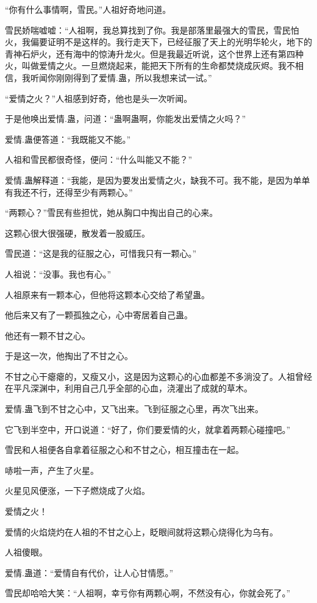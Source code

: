 \begin{this_body}
“你有什么事情啊，雪民。”人祖好奇地问道。

雪民娇喘嘘嘘：“人祖啊，我总算找到了你。我是部落里最强大的雪民，雪民怕火，我偏要证明不是这样的。我行走天下，已经征服了天上的光明华轮火，地下的青神石炉火，还有海中的惊涛升龙火。但是我最近听说，这个世界上还有第四种火，叫做爱情之火。一旦燃烧起来，能把天下所有的生命都焚烧成灰烬。我不相信，我听闻你刚刚得到了爱情.蛊，所以我想来试一试。”

“爱情之火？”人祖感到好奇，他也是头一次听闻。

于是他唤出爱情.蛊，问道：“蛊啊蛊啊，你能发出爱情之火吗？”

爱情.蛊便答道：“我既能又不能。”

人祖和雪民都很奇怪，便问：“什么叫能又不能？”

爱情.蛊解释道：“我能，是因为要发出爱情之火，缺我不可。我不能，是因为单单有我还不行，还得至少有两颗心。”

“两颗心？”雪民有些担忧，她从胸口中掏出自己的心来。

这颗心很大很强硬，散发着一股威压。

雪民道：“这是我的征服之心，可惜我只有一颗心。”

人祖说：“没事。我也有心。”

人祖原来有一颗本心，但他将这颗本心交给了希望蛊。

他后来又有了一颗孤独之心，心中寄居着自己蛊。

他还有一颗不甘之心。

于是这一次，他掏出了不甘之心。

不甘之心干瘪瘪的，又瘦又小，这是因为这颗心的心血都差不多淌没了。人祖曾经在平凡深渊中，利用自己几乎全部的心血，浇灌出了成就的草木。

爱情.蛊飞到不甘之心中，又飞出来。飞到征服之心里，再次飞出来。

它飞到半空中，开口说道：“好了，你们要爱情的火，就拿着两颗心碰撞吧。”

雪民和人祖便各自拿着征服之心和不甘之心，相互撞击在一起。

哧啦一声，产生了火星。

火星见风便涨，一下子燃烧成了火焰。

爱情之火！

爱情的火焰烧灼在人祖的不甘之心上，眨眼间就将这颗心烧得化为乌有。

人祖傻眼。

爱情.蛊道：“爱情自有代价，让人心甘情愿。”

雪民却哈哈大笑：“人祖啊，幸亏你有两颗心啊，不然没有心，你就会死了。”


\end{this_body}
